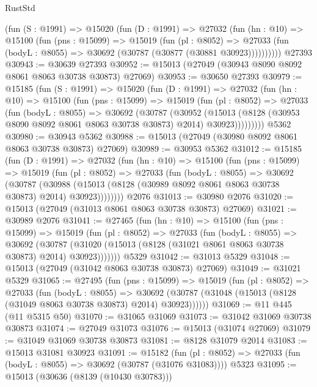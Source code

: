\begin{lexlean}{RustStd}
\begin{coremodule}
      (fun (S : @1991) =>
      @15020
        (fun (D : @1991) =>
        @27032
          (fun (hn : @10) =>
          @15100
            (fun (pns : @15099) =>
            @15019
              (fun (pl : @8052) =>
              @27033 (fun (bodyL : @8055) => @30692 (@30787 (@30877 (@30881 @30923))))))))))
    @27393
@30943 := @30639 @27393
@30952 := @15013 (@27049 (@30943 @8090 @8092 @8061 @8063 @30738 @30873) @27069)
@30953 := @30650 @27393
@30979 := @15185
    (fun (S : @1991) =>
    @15020
      (fun (D : @1991) =>
      @27032
        (fun (hn : @10) =>
        @15100
          (fun (pns : @15099) =>
          @15019
            (fun (pl : @8052) =>
            @27033
              (fun (bodyL : @8055) =>
              @30692
                (@30787
                  (@30952
                    (@15013
                      (@8128 (@30953 @8090 @8092 @8061 @8063 @30738 @30873) @2014)
                      @30923)))))))))
    @5362
@30980 := @30943 @5362
@30988 := @15013 (@27049 (@30980 @8092 @8061 @8063 @30738 @30873) @27069)
@30989 := @30953 @5362
@31012 := @15185
    (fun (D : @1991) =>
    @27032
      (fun (hn : @10) =>
      @15100
        (fun (pns : @15099) =>
        @15019
          (fun (pl : @8052) =>
          @27033
            (fun (bodyL : @8055) =>
            @30692
              (@30787
                (@30988
                  (@15013 (@8128 (@30989 @8092 @8061 @8063 @30738 @30873) @2014) @30923))))))))
    @2076
@31013 := @30980 @2076
@31020 := @15013 (@27049 (@31013 @8061 @8063 @30738 @30873) @27069)
@31021 := @30989 @2076
@31041 := @27465
    (fun (hn : @10) =>
    @15100
      (fun (pns : @15099) =>
      @15019
        (fun (pl : @8052) =>
        @27033
          (fun (bodyL : @8055) =>
          @30692
            (@30787 (@31020 (@15013 (@8128 (@31021 @8061 @8063 @30738 @30873) @2014) @30923)))))))
    @5329
@31042 := @31013 @5329
@31048 := @15013 (@27049 (@31042 @8063 @30738 @30873) @27069)
@31049 := @31021 @5329
@31065 := @27495
    (fun (pns : @15099) =>
    @15019
      (fun (pl : @8052) =>
      @27033
        (fun (bodyL : @8055) =>
        @30692 (@30787 (@31048 (@15013 (@8128 (@31049 @8063 @30738 @30873) @2014) @30923))))))
@31069 := @11 @445 (@11 @5315 @50)
@31070 := @31065 @31069
@31073 := @31042 @31069 @30738 @30873
@31074 := @27049 @31073
@31076 := @15013 (@31074 @27069)
@31079 := @31049 @31069 @30738 @30873
@31081 := @8128 @31079 @2014
@31083 := @15013 @31081 @30923
@31091 := @15182
    (fun (pl : @8052) => @27033 (fun (bodyL : @8055) => @30692 (@30787 (@31076 @31083))))
    @5323
@31095 := @15013 (@30636 (@8139 (@10430 @30783)))

\end{coremodule}
\end{lexlean}
